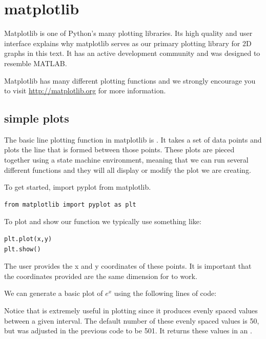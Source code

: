  \label{lab:Matplotlib and Mayavi}

\section*{matplotlib}

Matplotlib is one of Python's many plotting libraries. Its high quality
and user interface explains why matplotlib serves as our primary
plotting library for 2D graphs in this text. It has an active
development community and was designed to resemble MATLAB.

Matplotlib has many different plotting functions and we strongly
encourage you to visit \url{http://matplotlib.org} for more
information.

\subsection*{simple plots} 

The basic line plotting function in matplotlib is . It takes a
set of data points and plots the line that is formed between those points. 
These plots are pieced together using a state machine environment, meaning that 
we can run several different functions and they will all display or modify the 
plot we are creating. 

To get started, import pyplot from matplotlib.
\begin{lstlisting} 
from matplotlib import pyplot as plt
\end{lstlisting}

To plot and show our function we typically use something like:
\begin{lstlisting} 
plt.plot(x,y) 
plt.show() 
\end{lstlisting}

The user provides the x and y coordinates of these points. It is important that the 
coordinates provided are the same dimension for  to work. 

We can generate a basic plot of $e^x$ using the following lines of code:



Notice that  is extremely useful in plotting since it produces evenly spaced values between a given interval. The default number of these evenly spaced values is 50, but was adjusted in the previous code to be 501. It returns these values in an . 

